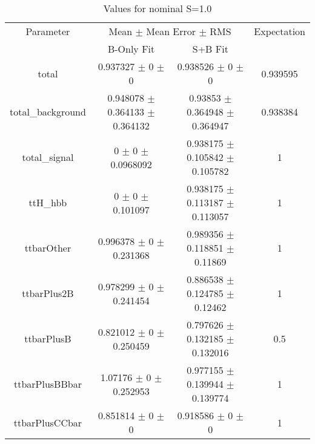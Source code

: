 \begin{table}
\centering
\caption{Values for nominal S=1.0}
\begin{tabular}{cccc}
\toprule
Parameter & \multicolumn{2}{c}{Mean $\pm$ Mean Error $\pm$ RMS} & Expectation\\
 & B-Only Fit & S+B Fit & \\
\midrule
total & \num{0.937327} $\pm$ \num{0} $\pm$ \num{0} & \num{0.938526} $\pm$ \num{0} $\pm$ \num{0} & \num{0.939595}\\
total\_background & \num{0.948078} $\pm$ \num{0.364133} $\pm$ \num{0.364132} & \num{0.93853} $\pm$ \num{0.364948} $\pm$ \num{0.364947} & \num{0.938384}\\
total\_signal & \num{0} $\pm$ \num{0} $\pm$ \num{0.0968092} & \num{0.938175} $\pm$ \num{0.105842} $\pm$ \num{0.105782} & \num{1}\\
ttH\_hbb & \num{0} $\pm$ \num{0} $\pm$ \num{0.101097} & \num{0.938175} $\pm$ \num{0.113187} $\pm$ \num{0.113057} & \num{1}\\
ttbarOther & \num{0.996378} $\pm$ \num{0} $\pm$ \num{0.231368} & \num{0.989356} $\pm$ \num{0.118851} $\pm$ \num{0.11869} & \num{1}\\
ttbarPlus2B & \num{0.978299} $\pm$ \num{0} $\pm$ \num{0.241454} & \num{0.886538} $\pm$ \num{0.124785} $\pm$ \num{0.12462} & \num{1}\\
ttbarPlusB & \num{0.821012} $\pm$ \num{0} $\pm$ \num{0.250459} & \num{0.797626} $\pm$ \num{0.132185} $\pm$ \num{0.132016} & \num{0.5}\\
ttbarPlusBBbar & \num{1.07176} $\pm$ \num{0} $\pm$ \num{0.252953} & \num{0.977155} $\pm$ \num{0.139944} $\pm$ \num{0.139774} & \num{1}\\
ttbarPlusCCbar & \num{0.851814} $\pm$ \num{0} $\pm$ \num{0} & \num{0.918586} $\pm$ \num{0} $\pm$ \num{0} & \num{1}\\
\bottomrule
\end{tabular}
\end{table}